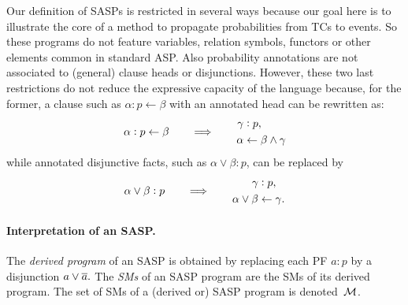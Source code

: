 \documentclass[a4paper]{article}
\newcommand{\eat}[1]{}
\newcommand{\cla}[1]{\ensuremath{{\cal #1}}}        %
\newcommand{\clause}{\ensuremath{\leftarrow}}
\newcommand{\co}[1]{\ensuremath{\overline{#1}}}     %
\newcommand{\MODELset}{\ensuremath{\cla{M}}}
\newcommand{\probfact}[2]{\ensuremath{#1:#2}}
\newcommand{\probrule}[3]{\probfact{#1}{#2} \leftarrow #3}
\newcommand{\franc}[1]{{\color{green!30!black}#1}}
\begin{document}
\eat{\franc{Discuss probabilities in the head of rules and in
    disjunctions (?).}}%

\franc{%
  Our definition of \acp{SASP} is restricted in several ways because
  our goal here is to illustrate the core of a method to propagate
  probabilities from \aclp{TC} to events.  So these programs do not
  feature variables, relation symbols, functors or other elements
  common in standard \ac{ASP}.  Also probability annotations are not
  associated to (general) clause heads or disjunctions.  However,
  these two last restrictions do not reduce the expressive capacity of
  the language because, for the former, a clause such as
  \( \probrule{\alpha}{p}{\beta} \) with an annotated head can be
  rewritten as:
  \begin{equation*}
    \probrule{\alpha}{p}{\beta} \qquad \Longrightarrow \qquad
    \begin{aligned}
        \probfact{\gamma & }{p}, \\
        \alpha           & \clause \beta \wedge \gamma
    \end{aligned}
  \end{equation*}
  while annotated disjunctive facts, such as
    \( \probfact{\alpha \vee \beta}{p} \),
  can be replaced by
  \begin{equation*}
    \probfact{\alpha \vee \beta}{p} \qquad \Longrightarrow \qquad 
    \begin{aligned}
        \probfact{\gamma  & }{p}, \\
        \alpha \vee \beta & \clause \gamma.
    \end{aligned}
  \end{equation*}
}

\paragraph{Interpretation of an SASP.}

The \emph{derived program} of an \ac{SASP} is obtained by replacing
each \acl{PF} \(\probfact{a}{p}\) by a disjunction
   \( a \disj \co{a}. \)
The \textit{\aclp{SM}} of an \acs{SASP} program are the \aclp{SM}
of its derived program.
The set of \acp{SM} of a (derived or) \acs{SASP} program is
denoted~\(\MODELset\).
\end{document}

